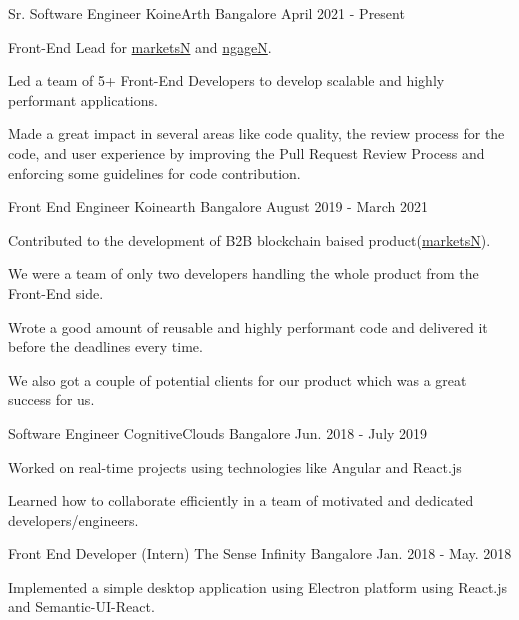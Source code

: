 \begin{cventries}
  \cventry
    {Sr. Software Engineer}
    {KoineArth}
    {Bangalore}
    {April 2021 - Present}
    {
      \begin{cvitems}
        \item{Front-End Lead for \href{https://marketsn.com/}{marketsN} and \href{https://ngagen.com/}{ngageN}.}
        \item{Led a team of 5+ Front-End Developers to develop scalable and highly performant applications.}
        \item{Made a great impact in several areas like code quality, the review process for the code, and user experience by improving the Pull Request Review Process and enforcing some guidelines for code contribution.}
      \end{cvitems}
    }
  \cventry
    {Front End Engineer}
    {Koinearth}
    {Bangalore}
    {August 2019 - March 2021}
    {
        \begin{cvitems}
            \item{Contributed to the development of B2B blockchain baised product(\href{https://marketsn.com/}{marketsN}).}
            \item{We were a team of only two developers handling the whole product from the Front-End side.}
            \item{Wrote a good amount of reusable and highly performant code and delivered it before the deadlines every time.}
            \item{We also got a couple of potential clients for our product which was a great success for us.}
        \end{cvitems}
  }
  \cventry
    {Software Engineer}
    {CognitiveClouds}
    {Bangalore}
    {Jun. 2018 - July 2019}
    {
      \begin{cvitems}
        \item{Worked on real-time projects using technologies like Angular and React.js}
        \item{Learned how to collaborate efficiently in a team of motivated and dedicated developers/engineers.}
      \end{cvitems}
    }
  \cventry
    {Front End Developer (Intern)}
    {The Sense Infinity}
    {Bangalore}
    {Jan. 2018 - May. 2018}
    {
      \begin{cvitems}
        \item{ Implemented a simple desktop application using Electron platform using React.js and Semantic-UI-React.}

\end{cvitems}}
\end{cventries}
